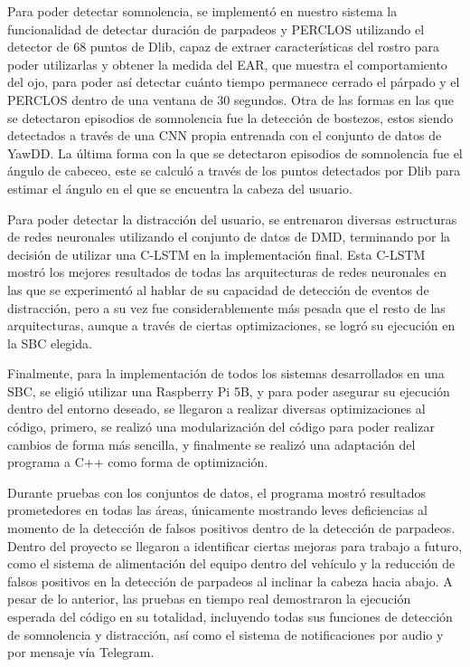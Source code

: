 Para poder detectar somnolencia, se implementó en nuestro sistema la funcionalidad de detectar duración de parpadeos y PERCLOS utilizando el detector de 68 puntos de Dlib, capaz de extraer características del rostro para poder utilizarlas y obtener la medida del EAR, que muestra el comportamiento del ojo, para poder así detectar cuánto tiempo permanece cerrado el párpado y el PERCLOS dentro de una ventana de 30 segundos. Otra de las formas en las que se detectaron episodios de somnolencia fue la detección de bostezos, estos siendo detectados a través de una CNN propia entrenada con el conjunto de datos de YawDD. La última forma con la que se detectaron episodios de somnolencia fue el ángulo de cabeceo, este se calculó a través de los puntos detectados por Dlib para estimar el ángulo en el que se encuentra la cabeza del usuario.

Para poder detectar la distracción del usuario, se entrenaron diversas estructuras de redes neuronales utilizando el conjunto de datos de DMD, terminando por la decisión de utilizar una C-LSTM en la implementación final. Esta C-LSTM mostró los mejores resultados de todas las arquitecturas de redes neuronales en las que se experimentó al hablar de su capacidad de detección de eventos de distracción, pero a su vez fue considerablemente más pesada que el resto de las arquitecturas, aunque a través de ciertas optimizaciones, se logró su ejecución en la SBC elegida.

Finalmente, para la implementación de todos los sistemas desarrollados en una SBC, se eligió utilizar una Raspberry Pi 5B, y para poder asegurar su ejecución dentro del entorno deseado, se llegaron a realizar diversas optimizaciones al código, primero, se realizó una modularización del código para poder realizar cambios de forma más sencilla, y finalmente se realizó una adaptación del programa a C++ como forma de optimización.

Durante pruebas con los conjuntos de datos, el programa mostró resultados prometedores en todas las áreas, únicamente mostrando leves deficiencias al momento de la detección de falsos positivos dentro de la detección de parpadeos. Dentro del proyecto se llegaron a identificar ciertas mejoras para trabajo a futuro, como el sistema de alimentación del equipo dentro del vehículo y la reducción de falsos positivos en la detección de parpadeos al inclinar la cabeza hacia abajo. A pesar de lo anterior, las pruebas en tiempo real demostraron la ejecución esperada del código en su totalidad, incluyendo todas sus funciones de detección de somnolencia y distracción, así como el sistema de notificaciones por audio y por mensaje vía Telegram. 
